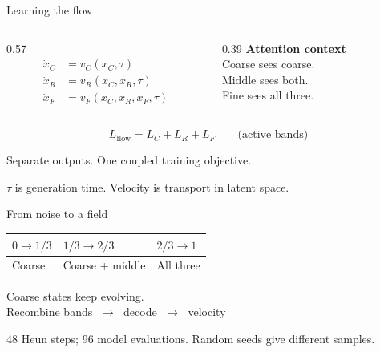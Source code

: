 \documentclass[aspectratio=169,12pt]{beamer}
\begin{document}
\begin{frame}{Learning the flow}
 \begin{columns}[c]
  \begin{column}{0.57\textwidth}
   \[
   \begin{aligned}
    \dot x_C&=v_C(x_C,\tau)\\[0.2cm]
    \dot x_R&=v_R(x_C,x_R,\tau)\\[0.2cm]
    \dot x_F&=v_F(x_C,x_R,x_F,\tau)
   \end{aligned}
   \]
  \end{column}
  \begin{column}{0.39\textwidth}
   \textbf{Attention context}\\[0.3cm]
   Coarse sees coarse.\\[0.2cm]
   Middle sees both.\\[0.2cm]
   Fine sees all three.
  \end{column}
 \end{columns}
 \vspace{0.45cm}
 \[
 L_{\mathrm{flow}}=L_C+L_R+L_F\qquad\text{(active bands)}
 \]
 \begin{center}
 {\large Separate outputs. One coupled training objective.}
 \end{center}
 \vfill
 {\small\color{gray}$\tau$ is generation time. Velocity is transport in latent space.}
\end{frame}

\begin{frame}{From noise to a field}
 \begin{center}
 \begin{tabular}{lll}
 \toprule
 $0\to1/3$ & $1/3\to2/3$ & $2/3\to1$\\
 \midrule
 Coarse & Coarse + middle & All three\\
 \bottomrule
 \end{tabular}
 \end{center}
 \vspace{0.6cm}
 \begin{center}
 {\Large Coarse states keep evolving.}\\[0.6cm]
 {\large Recombine bands $\;\to\;$ decode $\;\to\;$ velocity}
 \end{center}
 \vfill
 {\small\color{gray}48 Heun steps; 96 model evaluations. Random seeds give different samples.}
\end{frame}
\end{document}
